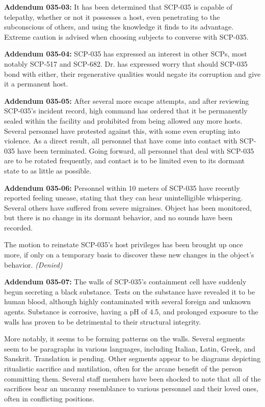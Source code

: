 \textbf{Addendum 035-03:} It has been determined that SCP-035 is capable of telepathy, whether or not it possesses a host, even penetrating to the subconscious of others, and using the knowledge it finds to its advantage. Extreme caution is advised when choosing subjects to converse with SCP-035.

\textbf{Addendum 035-04:} SCP-035 has expressed an interest in other SCPs, most notably SCP-517 and SCP-682. Dr.  has expressed worry that should SCP-035 bond with either, their regenerative qualities would negate its corruption and give it a permanent host.

\textbf{Addendum 035-05:} After several more escape attempts, and after reviewing SCP-035's incident record, high command has ordered that it be permanently sealed within the facility and prohibited from being allowed any more hosts. Several personnel have protested against this, with some even erupting into violence. As a direct result, all personnel that have come into contact with SCP-035 have been terminated. Going forward, all personnel that deal with SCP-035 are to be rotated frequently, and contact is to be limited even to its dormant state to as little as possible.

\textbf{Addendum 035-06:} Personnel within 10 meters of SCP-035 have recently reported feeling unease, stating that they can hear unintelligible whispering. Several others have suffered from severe migraines. Object has been monitored, but there is no change in its dormant behavior, and no sounds have been recorded.

The motion to reinstate SCP-035's host privileges has been brought up once more, if only on a temporary basis to discover these new changes in the object's behavior. \textsl{(Denied)}

\textbf{Addendum 035-07:} The walls of SCP-035's containment cell have suddenly begun secreting a black substance. Tests on the substance have revealed it to be human blood, although highly contaminated with several foreign and unknown agents. Substance is corrosive, having a pH of 4.5, and prolonged exposure to the walls has proven to be detrimental to their structural integrity.

More notably, it seems to be forming patterns on the walls. Several segments seem to be paragraphs in various languages, including Italian, Latin, Greek, and Sanskrit. Translation is pending. Other segments appear to be diagrams depicting ritualistic sacrifice and mutilation, often for the arcane benefit of the person committing them. Several staff members have been shocked to note that all of the sacrifices bear an uncanny resemblance to various personnel and their loved ones, often in conflicting positions.

